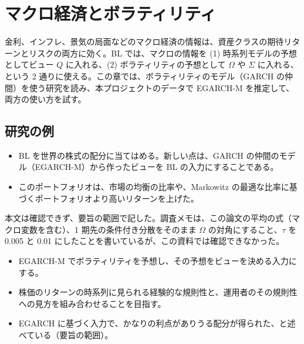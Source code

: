 \chapter{マクロ経済とボラティリティ}\label{ch:macro}

金利、インフレ、景気の局面などのマクロ経済の情報は、資産クラスの期待リターンとリスクの両方に効く。BL では、マクロの情報を (1) 時系列モデルの予想としてビュー $Q$ に入れる、(2) ボラティリティの予想として $\Omega$ や $\Sigma$ に入れる、という 2 通りに使える。この章では、ボラティリティのモデル（GARCH の仲間）を使う研究を読み、本プロジェクトのデータで EGARCH-M を推定して、両方の使い方を試す。

\section{研究の例}

\begin{paperbox}
\begin{itemize}
\item BL を世界の株式の配分に当てはめる。新しい点は、GARCH の仲間のモデル（EGARCH-M）から作ったビューを BL の入力にすることである。
\item このポートフォリオは、市場の均衡の比率や、Markowitz の最適な比率に基づくポートフォリオより高いリターンを上げた。
\end{itemize}
本文は確認できず、要旨の範囲で記した。調査メモは、この論文の平均の式（マクロ変数を含む）、1 期先の条件付き分散をそのまま $\Omega$ の対角にすること、$\tau$ を 0.005 と 0.01 にしたことを書いているが、この資料では確認できなかった。
\end{paperbox}

\begin{paperbox}
\begin{itemize}
\item EGARCH-M でボラティリティを予想し、その予想をビューを決める入力にする。
\item 株価のリターンの時系列に見られる経験的な規則性と、運用者のその規則性への見方を組み合わせることを目指す。
\item EGARCH に基づく入力で、かなりの利点がありうる配分が得られた、と述べている（要旨の範囲）。
\end{itemize}
\end{paperbox}

